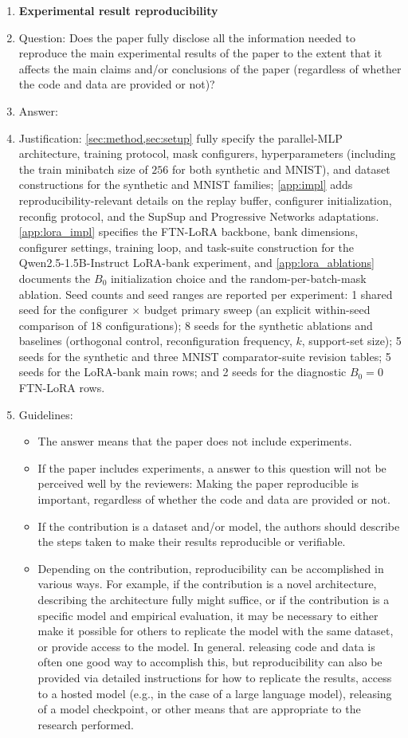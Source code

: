 \begin{enumerate}
    \item {\bf Experimental result reproducibility}
    \item[] Question: Does the paper fully disclose all the information needed to reproduce the main experimental results of the paper to the extent that it affects the main claims and/or conclusions of the paper (regardless of whether the code and data are provided or not)?
    \item[] Answer: \answerYes{}
    \item[] Justification: \cref{sec:method,sec:setup} fully specify the parallel-MLP architecture, training protocol, mask configurers, hyperparameters (including the train minibatch size of $256$ for both synthetic and MNIST), and dataset constructions for the synthetic and MNIST families; \cref{app:impl} adds reproducibility-relevant details on the replay buffer, configurer initialization, reconfig protocol, and the SupSup and Progressive Networks adaptations. \cref{app:lora_impl} specifies the FTN-LoRA backbone, bank dimensions, configurer settings, training loop, and task-suite construction for the Qwen2.5-1.5B-Instruct LoRA-bank experiment, and \cref{app:lora_ablations} documents the $B_0$ initialization choice and the random-per-batch-mask ablation. Seed counts and seed ranges are reported per experiment: 1 shared seed for the configurer$\,\times\,$budget primary sweep (an explicit within-seed comparison of 18 configurations); 8 seeds for the synthetic ablations and baselines (orthogonal control, reconfiguration frequency, $k$, support-set size); 5 seeds for the synthetic and three MNIST comparator-suite revision tables; 5 seeds for the LoRA-bank main rows; and 2 seeds for the diagnostic $B_0{=}0$ FTN-LoRA rows.
    \item[] Guidelines:
    \begin{itemize}
        \item The answer \answerNA{} means that the paper does not include experiments.
        \item If the paper includes experiments, a \answerNo{} answer to this question will not be perceived well by the reviewers: Making the paper reproducible is important, regardless of whether the code and data are provided or not.
        \item If the contribution is a dataset and\slash or model, the authors should describe the steps taken to make their results reproducible or verifiable.
        \item Depending on the contribution, reproducibility can be accomplished in various ways. For example, if the contribution is a novel architecture, describing the architecture fully might suffice, or if the contribution is a specific model and empirical evaluation, it may be necessary to either make it possible for others to replicate the model with the same dataset, or provide access to the model. In general. releasing code and data is often one good way to accomplish this, but reproducibility can also be provided via detailed instructions for how to replicate the results, access to a hosted model (e.g., in the case of a large language model), releasing of a model checkpoint, or other means that are appropriate to the research performed.

\end{itemize}
\end{enumerate}
